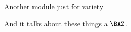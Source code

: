 Another module just for variety
\begin{module}[name=BAZ]
  And it talks about these things a $\BAZ$.
\end{module}


